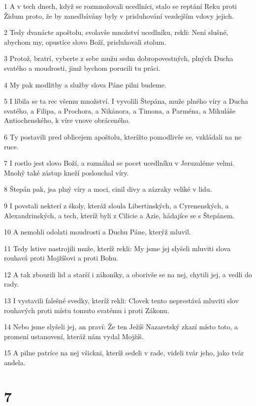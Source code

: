 \par 1 A v tech dnech, když se rozmnožovali ucedlníci, stalo se reptání Reku proti Židum proto, že by zanedbávány byly v prisluhování vezdejším vdovy jejich.
\par 2 Tedy dvanácte apoštolu, svolavše množství ucedlníku, rekli: Není slušné, abychom my, opustíce slovo Boží, prisluhovali stolum.
\par 3 Protož, bratrí, vyberte z sebe mužu sedm dobropovestných, plných Ducha svatého a moudrosti, jimž bychom porucili tu práci.
\par 4 My pak modlitby a služby slova Páne pilni budeme.
\par 5 I líbila se ta rec všemu množství. I vyvolili Štepána, muže plného víry a Ducha svatého, a Filipa, a Prochora, a Nikánora, a Timona, a Parména, a Mikuláše Antiochenského, k víre vnove obráceného.
\par 6 Ty postavili pred oblicejem apoštolu, kterížto pomodlivše se, vzkládali na ne ruce.
\par 7 I rostlo jest slovo Boží, a rozmáhal se pocet ucedlníku v Jeruzaléme velmi. Mnohý také zástup kneží poslouchal víry.
\par 8 Štepán pak, jsa plný víry a moci, cinil divy a zázraky veliké v lidu.
\par 9 I povstali nekterí z školy, kteráž sloula Libertinských, a Cyrenenských, a Alexandrinských, a tech, kteríž byli z Cilicie a Azie, hádajíce se s Štepánem.
\par 10 A nemohli odolati moudrosti a Duchu Páne, kterýž mluvil.
\par 11 Tedy lstive nastrojili muže, kteríž rekli: My jsme jej slyšeli mluviti slova rouhavá proti Mojžíšovi a proti Bohu.
\par 12 A tak zbourili lid a starší i zákoníky, a oborivše se na nej, chytili jej, a vedli do rady.
\par 13 I vystavili falešné svedky, kteríž rekli: Clovek tento neprestává mluviti slov rouhavých proti místu tomuto svatému i proti Zákonu.
\par 14 Nebo jsme slyšeli jej, an praví: Že ten Ježíš Nazaretský zkazí místo toto, a promení ustanovení, kteráž nám vydal Mojžíš.
\par 15 A pilne patríce na nej všickni, kteríž sedeli v rade, videli tvár jeho, jako tvár andela.

\chapter{7}

